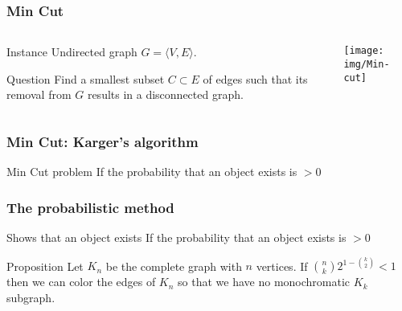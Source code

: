 \documentclass[12pt,aspectratio=169]{beamer}
\begin{document}
\begin{frame}\frametitle{Min Cut}
\begin{columns}
  \begin{column}{0.48\textwidth}
  \begin{block}{Instance}
    Undirected graph $G=\langle V,E \rangle$.
  \end{block}
  \begin{block}{Question}
    Find a smallest subset $C\subset E$ of edges such that its removal from $G$ results
    in a disconnected graph.
  \end{block}
\end{column}

    \begin{column}{0.48\textwidth}
      \centering

  \texttt{[image: img/Min-cut]}
\end{column}
\end{columns}
\end{frame}


\begin{frame}[fragile]
\frametitle{Min Cut: Karger's algorithm}
\begin{block}{Min Cut problem}
  If the probability that an object exists is $>0$
\end{block}
\end{frame}

\begin{frame}[fragile]
\frametitle{The probabilistic method}
\begin{block}{Shows that an object exists}
  If the probability that an object exists is $>0$
\end{block}

\begin{block}{Proposition}
  Let $K_{n}$ be the complete graph with $n$ vertices.
%
If ${n \choose k} 2^{1- {k \choose 2}} <1$ then we can color the edges of $K_{n}$ so that we
have no monochromatic $K_{k}$ subgraph.
%
\end{block}
\end{frame}
\end{document}
